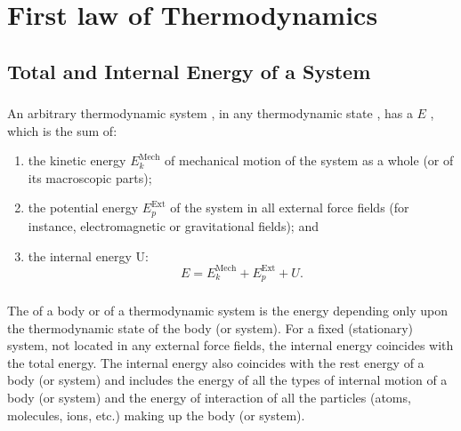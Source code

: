 
\chapter{First law of Thermodynamics}
\label{ch-09}


\section[Total and Internal Energy]{Total and Internal Energy of a System}
\label{sec-9.1}

\subsection{}\label{9.1.1} An arbitrary thermodynamic system , in any thermodynamic state , has a  $E$ , which is the sum of:
\begin{enumerate}[label=(\alph*)]
\item the kinetic energy $E_{k}^{\textrm{Mech}}$ of mechanical motion of the system
as a whole (or of its macroscopic parts);
\item the potential energy $E_{p}^{\textrm{Ext}}$  of the system in all external force fields (for instance, electromagnetic or gravitational fields); and
\item the internal energy U:
\begin{equation*}%
E = E_{k}^{\textrm{Mech}} + E_{p}^{\textrm{Ext}} + U.
\end{equation*}
\end{enumerate}

\subsection{}\label{9.1.2} The  of a body or of a thermodynamic system  is the energy depending only upon the thermodynamic state of the body (or system). For a fixed (stationary) system, not located in any external force fields, the internal energy coincides with the total energy. The internal energy also coincides with the rest energy of a body (or system)  and includes the energy of all the types of internal motion of a body (or system) and the energy of interaction of all the particles (atoms, molecules, ions, etc.) making up the body (or system).

